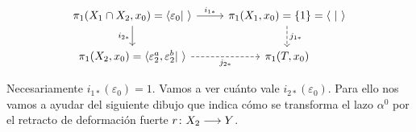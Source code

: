 \documentclass[GTS.tex]{subfiles}
\begin{document}
\begin{ej}
\begin{itemize}
\[
\begin{tikzcd}
\pi_1(X_1\cap X_2,x_0)=\langle \varepsilon_0|\ \rangle \ar[r, "i_{1*}"]\arrow[d,"i_{2*}"'] & \pi_1(X_1,x_0)=\{1\}=\langle\ |\ \rangle\arrow[d,dashed,"j_{1*}"]\\
\pi_1(X_2,x_0)=\langle \varepsilon_2^a,\varepsilon_2^b|\ \rangle\arrow[r,dashrightarrow,"j_{2*}"'] & \pi_1(T,x_0)
\end{tikzcd}
\]

Necesariamente $i_{1*}(\varepsilon_0)=1$. Vamos a ver cuánto vale $i_{2*}(\varepsilon_0)$. Para ello nos vamos a ayudar del siguiente dibujo que indica cómo se transforma el lazo $\alpha^0$ por el retracto de deformación fuerte $r\colon{X_2}\longrightarrow{Y}$.

\end{itemize}
\end{ej}
\end{document}

